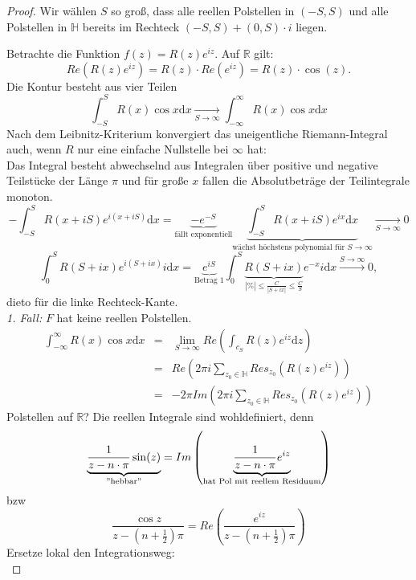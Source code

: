 \documentclass[11pt,titlepage]{article}
\theoremstyle{definition}
\theoremstyle{remark}
\begin{document}
	\begin{proof}
		Wir wählen $S$ so groß, dass alle reellen Polstellen in $(-S,S)$ und alle Polstellen in $\mathbb{H}$ 
		bereits im Rechteck $(-S,S)+(0,S)\cdot i$ liegen. 
		
		
		
		Betrachte die Funktion $f(z)=R(z)e^{iz}$. Auf 
		$\mathbb{R}$ gilt:
		\[ Re\left( R(z)e^{iz}\right)= R(z)\cdot Re(e^{iz}) =R(z)\cdot \cos(z). \]
		Die Kontur besteht aus vier Teilen
		\[ \int_{-S}^S R(x)\cos x \mathrm{d}x \xrightarrow[S\to\infty]{} \int_{-\infty}^{\infty} R(x)\cos x\mathrm{d}x\]
		Nach dem Leibnitz-Kriterium konvergiert das uneigentliche Riemann-Integral auch, wenn $R$ nur eine 
		einfache Nullstelle bei $\infty$ hat:\\
		
		
		Das Integral besteht abwechselnd aus Integralen über positive und negative Teilstücke der Länge 
		$\pi$ und für große $x$ fallen die Absolutbeträge der Teilintegrale monoton.
		\[ -\int_{-S}^S R(x+iS)e^{i(x+iS)}\mathrm{d}x=\underbrace{-e^{-S}}_{\text{fällt exponentiell}}
		\underbrace{\int_{-S}^S R(x+iS) e^{ix}\mathrm{d}x}_{\text{wächst höchstens polynomial für }S\to\infty}
		\xrightarrow[S\to\infty]{}0 \]
		\[ \int_0^S R(S+ix)e^{i(S+ix)}i\mathrm{d}x = \underbrace{e^{iS}}_{\text{Betrag $1$}}
		\int_0^S \underbrace{R(S+ix)}_{|\%|\leq\frac{C}{|S+ix|}\leq\frac{C}{S}}e^{-x}i\mathrm{d}x 
		\overset{S\to\infty}{\to}0, \]
		dieto für die linke Rechteck-Kante. \\
		\textsl{1. Fall:} $F$ hat keine reellen Polstellen.
		\begin{eqnarray*}
			\int_{-\infty}^{\infty} R(x)\cos x\mathrm{d}x &=& \lim_{S\to\infty} Re\left(\int_{c_S}R(z)e^{iz}
			\mathrm{d}z\right) \\
			&=& Re\left( 2\pi i\sum_{z_0\in\mathbb{H}}Res_{z_0}\left(R(z)e^{iz}\right)\right) \\
			&=& -2\pi Im\left( 2\pi i\sum_{z_0\in\mathbb{H}}Res_{z_0}\left(R(z)e^{iz}\right)\right) 
		\end{eqnarray*}
		Polstellen auf $\mathbb{R}$? Die reellen Integrale sind wohldefiniert, denn
		\[ \underbrace{\frac{1}{z-n\cdot\pi}\sin(z)}_{\text{$"$hebbar$"$}} 
		=Im\left(\underbrace{\frac{1}{z-n\cdot\pi}e^{iz}}_{\text{hat Pol mit reellem Residuum}}\right) \]
		bzw
		\[ \frac{\cos z}{z-(n+\frac{1}{2})\pi} = Re\left( \frac{e^{iz}}{z-(n+\frac{1}{2})\pi}\right) \]
		Ersetze lokal den Integrationsweg:\\
		

\end{proof}
\end{document}
